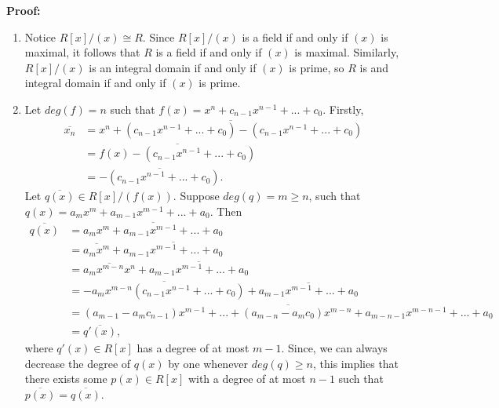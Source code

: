 \documentclass{article}
\begin{document}
\noindent \textbf{Proof:}\begin{enumerate}
    \item Notice $R[x]/(x)\cong R$. Since $R[x]/(x)$ is a field if and only if $(x)$ is maximal, it follows that $R$ is a field if and only if $(x)$ is maximal. Similarly, $R[x]/(x)$ is an integral domain if and only if $(x)$ is prime, so $R$ is and integral domain if and only if $(x)$ is prime.
    
    \item Let $deg(f)=n$ such that $f(x) = x^n + c_{n-1} x^{n-1} + ... + c_0$. Firstly,
    \begin{align*}
        \overline{x_n}&=\overline{x^n + (c_{n-1} x^{n-1} + ... + c_0) -(c_{n-1} x^{n-1} + ... + c_0)}\\
        &=\overline{f(x) - (c_{n-1} x^{n-1} + ... + c_0)}\\
        &=\overline{-(c_{n-1} x^{n-1} + ... + c_0)}.
    \end{align*} Let $\overline{q(x)}\in R[x]/(f(x))$. Suppose $deg(q)=m\ge n$, such that $q(x) = a_m x^m + a_{m-1} x^{m-1} + ... + a_0$. Then
    \begin{align*}
        \overline {q(x)} &= \overline{a_m x^m + a_{m-1} x^{m-1} + ... + a_0} \\
        &= \overline{a_m x^m} + \overline{a_{m-1} x^{m-1} + ... + a_0}\\
        &= \overline{a_m x^{m-n}x^n} + \overline{a_{m-1} x^{m-1} + ... + a_0}\\
        &=\overline{-a_m x^{m-n}(c_{n-1} x^{n-1} + ... + c_0)} + \overline{a_{m-1} x^{m-1} + ... + a_0} \\
        &=\overline{(a_{m-1} - a_m c_{n-1}) x^{m-1} + ... + (a_{m-n} - a_m c_0) x^{m-n} + a_{m-n-1} x^{m-n-1} + ... + a_0}\\
        &= \overline{q'(x)},
    \end{align*}
    where $q'(x)\in R[x]$ has a degree of at most $m-1$. Since, we can always decrease the degree of $q(x)$ by one whenever $deg(q) \ge n$, this implies that there exists some $p(x)\in R[x]$ with a degree of at most $n-1$ such that $\overline {p(x)} = \overline {q(x)}$.
    
\end{enumerate}

\end{document}
